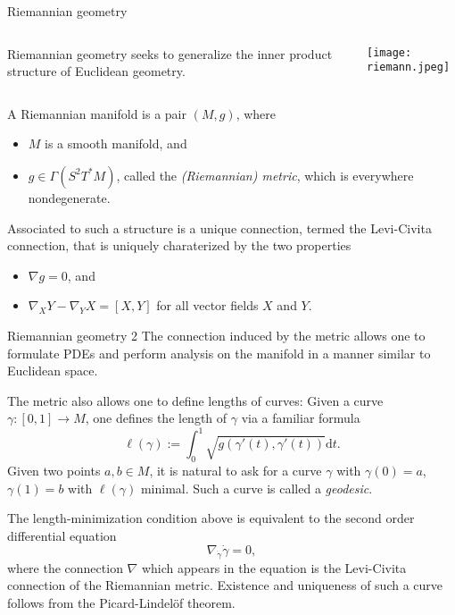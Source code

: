 \documentclass[handout]{beamer}
\begin{document}
\begin{frame}{Riemannian geometry}
  \begin{columns}
    \begin{column}{0.7 \textwidth}
      Riemannian geometry seeks to generalize the inner product structure of Euclidean geometry.
    \end{column}
    \begin{column}{0.3 \textwidth}
      \begin{center}
        \texttt{[image: riemann.jpeg]}
      \end{center}
    \end{column}
  \end{columns}
    \begin{definition}
      A Riemannian manifold is a pair $(M,g)$, where 
      \begin{itemize}
        \item $M$ is a smooth manifold, and 
        \item $g\in \Gamma(S^2 T^* M)$, called the \emph{(Riemannian) metric}, which is everywhere nondegenerate.
      \end{itemize}
    \end{definition}
  Associated to such a structure is a unique connection, termed the Levi-Civita connection, that is uniquely charaterized by the two properties
  \begin{itemize}
    \item $\nabla g = 0$, and 
    \item $\nabla_X Y - \nabla_Y X = [X,Y]$ for all vector fields $X$ and $Y$.
  \end{itemize}
\end{frame}

\begin{frame}{Riemannian geometry 2}
  The connection induced by the metric allows one to formulate PDEs and perform analysis on the manifold in a manner similar to Euclidean space.

  The metric also allows one to define lengths of curves:
  Given a curve $\gamma : [0,1] \to M$, one defines the length of $\gamma$ via a familiar formula 
  \[
    \ell(\gamma) := \int_0 ^1 \sqrt{g(\gamma'(t), \gamma'(t))} \text{d} t.
  \]
  Given two points $a,b \in M$, it is natural to ask for a curve $\gamma$ with $\gamma(0)=a$, $\gamma(1)=b$ with $\ell(\gamma)$ minimal.
  Such a curve is called a \emph{geodesic}.

  The length-minimization condition above is equivalent to the second order differential equation 
  \[
    \nabla_{\dot{\gamma}} \dot{\gamma} = 0,
  \]
  where the connection $\nabla$ which appears in the equation is the Levi-Civita connection of the Riemannian metric.
  Existence and uniqueness of such a curve follows from the Picard-Lindel\"{o}f theorem.
\end{frame}
\end{document}
